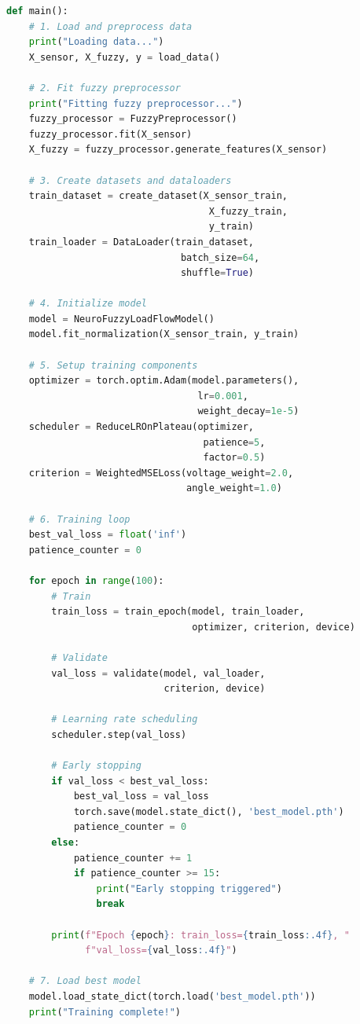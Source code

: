 \documentclass[12pt,a4paper]{report}
\begin{document}
\begin{lstlisting}[language=Python, caption={Main Training Function}]
def main():
    # 1. Load and preprocess data
    print("Loading data...")
    X_sensor, X_fuzzy, y = load_data()
    
    # 2. Fit fuzzy preprocessor
    print("Fitting fuzzy preprocessor...")
    fuzzy_processor = FuzzyPreprocessor()
    fuzzy_processor.fit(X_sensor)
    X_fuzzy = fuzzy_processor.generate_features(X_sensor)
    
    # 3. Create datasets and dataloaders
    train_dataset = create_dataset(X_sensor_train, 
                                    X_fuzzy_train, 
                                    y_train)
    train_loader = DataLoader(train_dataset, 
                               batch_size=64, 
                               shuffle=True)
    
    # 4. Initialize model
    model = NeuroFuzzyLoadFlowModel()
    model.fit_normalization(X_sensor_train, y_train)
    
    # 5. Setup training components
    optimizer = torch.optim.Adam(model.parameters(), 
                                  lr=0.001, 
                                  weight_decay=1e-5)
    scheduler = ReduceLROnPlateau(optimizer, 
                                   patience=5, 
                                   factor=0.5)
    criterion = WeightedMSELoss(voltage_weight=2.0, 
                                angle_weight=1.0)
    
    # 6. Training loop
    best_val_loss = float('inf')
    patience_counter = 0
    
    for epoch in range(100):
        # Train
        train_loss = train_epoch(model, train_loader, 
                                 optimizer, criterion, device)
        
        # Validate
        val_loss = validate(model, val_loader, 
                            criterion, device)
        
        # Learning rate scheduling
        scheduler.step(val_loss)
        
        # Early stopping
        if val_loss < best_val_loss:
            best_val_loss = val_loss
            torch.save(model.state_dict(), 'best_model.pth')
            patience_counter = 0
        else:
            patience_counter += 1
            if patience_counter >= 15:
                print("Early stopping triggered")
                break
        
        print(f"Epoch {epoch}: train_loss={train_loss:.4f}, "
              f"val_loss={val_loss:.4f}")
    
    # 7. Load best model
    model.load_state_dict(torch.load('best_model.pth'))
    print("Training complete!")
\end{lstlisting}
\end{document}
